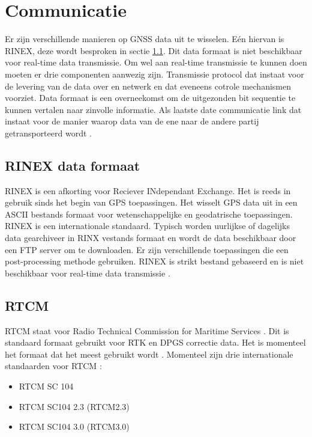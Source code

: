 \section{Communicatie}
\label{LCom}
Er zijn verschillende manieren op GNSS data uit te wisselen. E\'en hiervan is RINEX, deze wordt besproken in sectie \ref{LRin}. Dit data formaat is niet beschikbaar voor real-time data transmissie. Om wel aan real-time transmissie te kunnen doen moeten er drie componenten aanwezig zijn. Transmissie protocol dat instaat voor de levering van de data over en netwerk en dat eveneens cotrole mechanismen voorziet. Data formaat is een overneekomst om de uitgezonden bit sequentie te kunnen vertalen naar zinvolle informatie. Als laatste date communicatie link dat instaat voor de manier waarop data van de ene naar de andere partij getransporteerd wordt \cite{LBibRTCM}.


\subsection{RINEX data formaat}
\label{LRin}
RINEX is een afkorting voor Reciever INdependant Exchange. Het is reeds in gebruik sinds het begin van GPS toepassingen. Het wisselt GPS data uit in een ASCII bestands formaat voor wetenschappelijke en geodatrische toepassingen. RINEX is een internationale standaard. Typisch worden uurlijkse of dagelijks data gearchiveer in RINX vestands formaat en wordt de data beschikbaar door een FTP server om te downloaden. Er zijn verschillende toepassingen die een post-processing methode gebruiken. RINEX is strikt bestand gebaseerd en is niet beschikbaar voor real-time data transmissie \cite{LBibRTCM}. 

\subsection{RTCM}
RTCM staat voor Radio Technical Commission for Maritime Services \cite{LBibGLONASS}. Dit is standaard formaat gebruikt voor RTK en DPGS correctie data. Het is momenteel het formaat dat het meest gebruikt wordt \cite{LBibRTK3}.
Momenteel zijn drie internationale standaarden voor RTCM \cite{LBibRTCM}:
\begin{itemize}
	\item RTCM SC 104
	\item RTCM SC104 2.3 (RTCM2.3)
	\item RTCM SC104 3.0 (RTCM3.0) 
\end{itemize}

